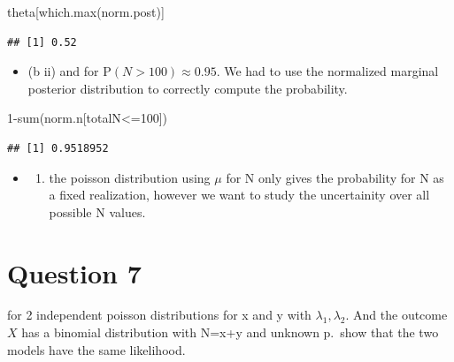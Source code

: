 \documentclass[
]{book}
\newenvironment{Shaded}{\begin{snugshade}}{\end{snugshade}}
\newcommand{\DecValTok}[1]{\textcolor[rgb]{0.00,0.00,0.81}{#1}}
\newcommand{\FunctionTok}[1]{\textcolor[rgb]{0.00,0.00,0.00}{#1}}
\newcommand{\NormalTok}[1]{#1}
\newcommand{\SpecialCharTok}[1]{\textcolor[rgb]{0.00,0.00,0.00}{#1}}
\providecommand{\tightlist}{%
  \setlength{\itemsep}{0pt}\setlength{\parskip}{0pt}}
\theoremstyle{definition}
\theoremstyle{definition}
\theoremstyle{definition}
\theoremstyle{definition}
\theoremstyle{remark}
\begin{document}
\begin{Shaded}
\begin{Highlighting}[]
\NormalTok{  theta[}\FunctionTok{which.max}\NormalTok{(norm.post)]}
\end{Highlighting}
\end{Shaded}

\begin{verbatim}
## [1] 0.52
\end{verbatim}

\begin{itemize}
\tightlist
\item
  (b ii) and for P\((N>100) \approx 0.95\). We had to use the normalized marginal posterior distribution to correctly compute the probability.
\end{itemize}

\begin{Shaded}
\begin{Highlighting}[]
\DecValTok{1}\SpecialCharTok{{-}}\FunctionTok{sum}\NormalTok{(norm.n[totalN}\SpecialCharTok{\textless{}=}\DecValTok{100}\NormalTok{])}
\end{Highlighting}
\end{Shaded}

\begin{verbatim}
## [1] 0.9518952
\end{verbatim}

\begin{itemize}
\item
  \begin{enumerate}
  \def\labelenumi{(\alph{enumi})}
  \setcounter{enumi}{3}
  \tightlist
  \item
    the poisson distribution using \(\mu\) for N only gives the probability for N as a fixed realization, however we want to study the uncertainity over all possible N values.
  \end{enumerate}
\end{itemize}

\hypertarget{question-7-1}{%
\section*{Question 7}\label{question-7-1}}

for 2 independent poisson distributions for x and y with \(\lambda_1,\lambda_2\). And the outcome \(X\) has a binomial distribution with N=x+y and unknown p.~show that the two models have the same likelihood.
\end{document}
